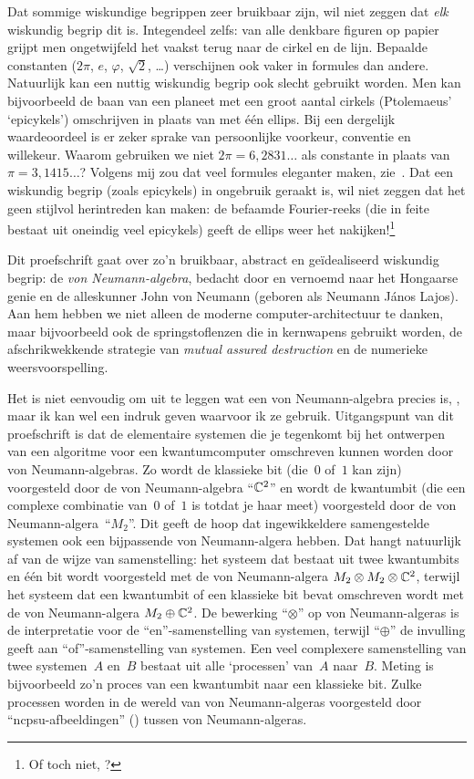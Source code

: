 \documentclass[b5paper]{book}
\begin{document}
Dat sommige wiskundige begrippen zeer bruikbaar zijn,
wil niet zeggen dat \emph{elk} wiskundig begrip dit is.
Integendeel zelfs:
van alle denkbare figuren op papier
grijpt men ongetwijfeld het vaakst terug
naar de cirkel en de lijn.
Bepaalde constanten ($2\pi$, $e$, $\varphi$, $\sqrt{2}$, \ldots) 
verschijnen ook vaker in formules dan andere.
Natuurlijk kan een nuttig wiskundig begrip 
ook slecht gebruikt worden.
Men kan bijvoorbeeld 
de baan van een planeet met een groot
aantal cirkels (Ptolemaeus' `epicykels') 
omschrijven in plaats van met \'e\'en ellips.
Bij een dergelijk waardeoordeel is er zeker sprake van persoonlijke
voorkeur, conventie en willekeur. Waarom gebruiken
we niet $2\pi=6,\!2831\dotsc$
als constante in plaats van
$\pi=3,\!1415\dotsc$? Volgens mij zou
dat veel formules eleganter maken,
zie~\cite{palais2001pi}.
Dat een wiskundig begrip (zoals epicykels)
in ongebruik geraakt is, wil niet zeggen
dat het geen stijlvol herintreden kan maken:
de befaamde Fourier-reeks (die in feite bestaat uit oneindig veel epicykels)
geeft de ellips weer 
het nakijken!\footnote{Of toch niet,  \cite{mayer2010drawing}?}

Dit proefschrift gaat over zo'n bruikbaar, abstract en 
ge\"idealiseerd wiskundig begrip:
de \emph{von Neumann-algebra},
bedacht door en vernoemd naar het Hongaarse genie
en de alleskunner
John von Neumann (geboren als Neumann J\'anos Lajos).
Aan hem hebben we niet alleen
de moderne computer-architectuur te danken,
maar bijvoorbeeld ook de springstoflenzen die in kernwapens gebruikt worden,
de afschrikwekkende strategie van \emph{mutual assured destruction}
en de numerieke weersvoorspelling.

Het is niet eenvoudig om uit te leggen
 wat een von Neumann-algebra precies is, ,
 maar 
ik kan wel een indruk geven waarvoor ik ze gebruik.
Uitgangspunt van dit proefschrift is dat 
de elementaire
systemen
die je tegenkomt bij het ontwerpen van een algoritme
voor een kwantumcomputer omschreven
kunnen worden door von Neumann-algebras.
Zo wordt de klassieke bit (die~$0$ of~$1$ kan zijn)
voorgesteld door de von Neumann-algebra ``$\mathbb{C}^2$''
en wordt de kwantumbit (die een complexe combinatie van~$0$ of~$1$ is totdat
je haar meet)
voorgesteld door de von Neumann-algera~``$M_2$''.
Dit geeft de hoop dat ingewikkeldere samengestelde systemen
ook een bijpassende von Neumann-algera hebben.
Dat hangt natuurlijk af van de wijze van samenstelling:
het systeem dat bestaat uit twee kwantumbits en \'e\'en bit wordt voorgesteld
met de von Neumann-algera $M_2\otimes M_2 \otimes \mathbb{C}^2$,
terwijl het systeem dat een kwantumbit of een klassieke bit bevat 
omschreven wordt met de von Neumann-algera $M_2 \oplus \mathbb{C}^2$.
De bewerking ``$\otimes$'' op von Neumann-algeras
is de interpretatie voor de  ``en''-samenstelling van systemen, 
terwijl ``$\oplus$'' de invulling geeft aan ``of''-samenstelling van systemen.
Een veel complexere samenstelling van twee systemen~$A$ en~$B$
bestaat uit alle `processen' van~$A$ naar~$B$.
Meting is bijvoorbeeld zo'n proces van een kwantumbit naar een klassieke bit.
Zulke processen worden in de wereld van von Neumann-algeras
voorgesteld door ``ncpsu-afbeeldingen'' ()
tussen von Neumann-algeras.
\end{document}
